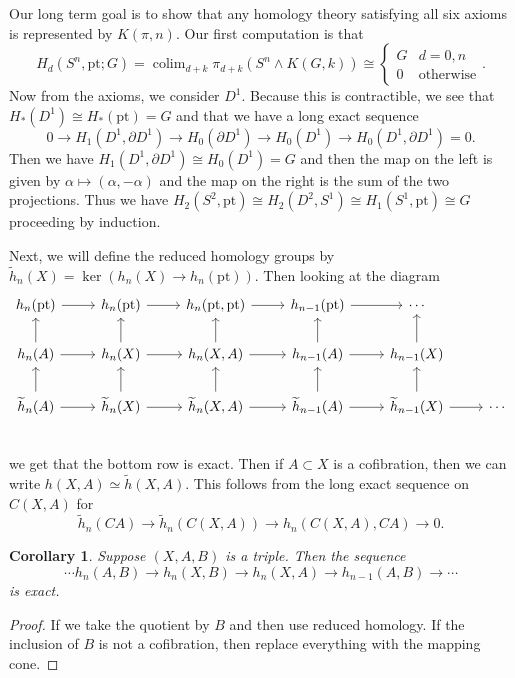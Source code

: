 \documentclass[leqno, openany]{memoir}
\newtheorem{cor}[thm]{Corollary}
\theoremstyle{definition}
\theoremstyle{remark}
\theoremstyle{plain}
\theoremstyle{definition}
\theoremstyle{remark}
\newcommand{\mr}[1]{\mathrm{#1}}
\newcommand{\wt}[1]{\widetilde{#1}}
\DeclareMathOperator{\colim}{colim}
\begin{document}
Our long term goal is to show that any homology theory satisfying all six axioms is represented by $K(\pi, n)$. Our first computation is that 
\[ H_d(S^n, \mr{pt}; G) = \colim_{d+k} \pi_{d+k}(S^n \wedge K(G, k)) \cong \begin{cases}
    G & d = 0,n \\
    0 & \text{otherwise}
\end{cases}. \]
Now from the axioms, we consider $D^1$. Because this is contractible, we see that $H_*(D^1) \cong H_*(\mr{pt}) = G$ and that we have a long exact sequence
\[ 0 \to H_1(D^1, \partial D^1) \to H_0(\partial D^1) \to H_0(D^1) \to H_0(D^1, \partial D^1) = 0. \]
Then we have $H_1(D^1, \partial D^1) \cong H_0(D^1) = G$ and then the map on the left is given by $\alpha \mapsto (\alpha, -\alpha)$ and the map on the right is the sum of the two projections. Thus we have $H_2(S^2, \mr{pt}) \cong H_2(D^2, S^1) \cong H_1(S^1, \mr{pt}) \cong G$ proceeding by induction. 

Next, we will define the reduced homology groups by $\wt{h}_n(X) = \ker (h_n(X) \to h_n(\mr{pt}))$. Then looking at the diagram
\begin{equation*}
\begin{tikzcd}
    h_n(\mr{pt}) \arrow{r} & h_n(\mr{pt}) \arrow{r} & h_n(\mr{pt}, \mr{pt}) \arrow{r} & h_{n-1}(\mr{pt}) \arrow{r} & \cdots \\
    h_n(A) \arrow{r} \arrow{u} & h_n(X) \arrow{r} \arrow{u} & h_n(X,A) \arrow{r} \arrow{u} & h_{n-1}(A) \arrow{r} \arrow{u} & h_{n-1}(X) \arrow{u} \\ 
    \wt{h}_n(A) \arrow{r} \arrow{u} & \wt{h}_n(X) \arrow{r} \arrow{u} & \wt{h}_n(X,A) \arrow{r} \arrow{u} & \wt{h}_{n-1}(A) \arrow{r} \arrow{u} & \wt{h}_{n-1}(X) \arrow{r} \arrow{u} & \cdots \\ 
\end{tikzcd}
\end{equation*}
we get that the bottom row is exact. Then if $A \subset X$ is a cofibration, then we can write $h(X,A) \simeq \wt{h}(X,A)$. This follows from the long exact sequence on $C(X,A)$ for 
\[ \wt{h}_n(CA) \to \wt{h}_n(C(X,A)) \to h_n(C(X,A), CA) \to 0. \]

\begin{cor}
    Suppose $(X,A,B)$ is a triple. Then the sequence
    \[ \cdots h_n(A,B) \to h_n(X,B) \to h_n(X,A) \to h_{n-1}(A,B) \to \cdots \]
    is exact.
\end{cor}

\begin{proof}
    If we take the quotient by $B$ and then use reduced homology. If the inclusion of $B$ is not a cofibration, then replace everything with the mapping cone.
\end{proof}
\end{document}

